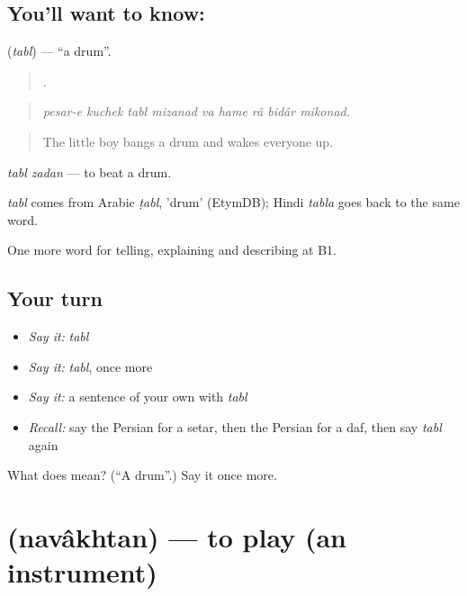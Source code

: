 \subsection*{You'll want to know: }
\textbf{} (\emph{tabl}) — \textquotedblleft{}a drum\textquotedblright{}.

\begin{quote}
        .
\end{quote}

\begin{quote}
\emph{pesar-e kuchek tabl mizanad va hame râ bidâr mikonad.}
\end{quote}

\begin{quote}
The little boy bangs a drum and wakes everyone up.
\end{quote}

\emph{tabl zadan} — to beat a drum.

\begin{cousinweb}
\emph{tabl} comes from Arabic \emph{ṭabl}, 'drum' (EtymDB); Hindi \emph{tabla} goes back to the same word.
\end{cousinweb}

\begin{grammarlens}[title={What you've built}]
One more word for telling, explaining and describing at B1.
\end{grammarlens}

\subsection*{Your turn}
\begin{itemize}
\raggedright
  \item \emph{Say it:} \emph{tabl}
  \item \emph{Say it:} \emph{tabl}, once more
  \item \emph{Say it:} a sentence of your own with \emph{tabl}
  \item \emph{Recall:} say the Persian for a setar, then the Persian for a daf, then say \emph{tabl} again
\end{itemize}

\begin{tcolorbox}[breakable,colback=teal!4,colframe=teal!35!black,title={Before you move on}]
What does  mean? (\textquotedblleft{}A drum\textquotedblright{}.) Say it once more.
\end{tcolorbox}
\section[\texorpdfstring{\fa{نواختن} (navâkhtan)}{نواختن (navâkhtan)}]{ (navâkhtan) — to play (an instrument)}

